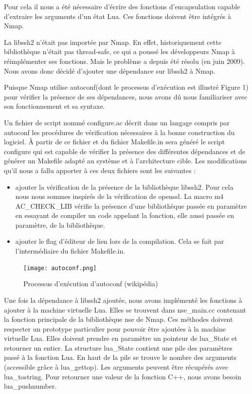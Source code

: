 \documentclass[frenchb]{article}
\begin{document}
Pour cela il nous a \'et\'e n\'ecessaire d'\'ecrire des fonctions d'encapsulation capable d'extraire les arguments d'un \'etat Lua. Ces fonctions doivent être int\'egr\'es à Nmap.

La \textsf{libssh2} n'\'etait pas import\'ee par Nmap. En effet, historiquement cette biblioth\`eque n'\'etait pas thread-safe, ce qui a pouss\'e les d\'eveloppeurs Nmap à r\'eimpl\'ementer ses fonctions. Mais le probl\`eme a depuis \'et\'e r\'esolu (en juin 2009). Nous avons donc d\'ecid\'e d'ajouter une d\'ependance sur \textsf{libssh2} à Nmap.

Puisque Nmap utilise \textsf{autoconf}(dont le processus d'exécution est illustré Figure 1) pour v\'erifier la pr\'esence de ses d\'ependances, nous avons dû nous familiariser avec son fonctionnement et sa syntaxe.

Un fichier de script nomm\'e \textsf{configure.ac} d\'ecrit dans un langage compris par \textsf{autoconf} les proc\'edures de v\'erification n\'ecessaires à la bonne construction du logiciel. À partir de ce fichier et du fichier \textsf{Makefile.in} sera g\'en\'er\'e le script \textsf{configure} qui est capable de v\'erifier la pr\'esence des diff\'erentes d\'ependances et de g\'en\'erer un \textsf{Makefile} adapt\'e au syst\`eme et à l'architecture cible.
Les modifications qu'il nous a fallu apporter à ces deux fichiers sont les suivantes :
\begin{itemize}
    \item ajouter la v\'erification de la pr\'esence de la biblioth\`eque \textsf{libssh2}. Pour cela nous nous sommes inspir\'es de la v\'erification de openssl. La macro \textsf{m4 AC\_CHECK\_LIB} v\'erifie la pr\'esence d'une biblioth\`eque pass\'ee en param\`etre en essayant de compiler un code appelant la fonction, elle aussi pass\'ee en param\`etre, de la biblioth\`eque.
    \item ajouter le flag d'\'editeur de lien lors de la compilation. Cela se fait par l'interm\'ediaire du fichier \textsf{Makefile.in}.
\end{itemize}

\begin{figure}[H]
  \center
  \texttt{[image: autoconf.png]}
  \caption{Processus d'exécution d'autoconf (wikipédia)}
  \label{autoconf}
\end{figure}

Une fois la d\'ependance à \textsf{libssh2} ajout\'ee, nous avons impl\'ement\'e les fonctions à ajouter à la machine virtuelle Lua. Elles se trouvent dans nse\_main.cc contenant la fonction principale de la biblioth\`eque nse de Nmap.
Ces m\'ethodes doivent respecter un prototype particulier pour pouvoir être ajout\'ees à la machine virtuelle Lua. Elles doivent prendre en param\`etre un pointeur de lua\_State et retourner un entier. La structure \textsf{lua\_State} contient une pile des param\`etres pass\'e à la fonction Lua. En haut de la pile se trouve le nombre des arguments (accessible grâce à \textsf{lua\_gettop}). Les arguments peuvent être r\'ecup\'er\'es avec lua\_tostring. Pour retourner une valeur de la fonction C++, nous avons besoin lua\_pushnumber.
\end{document}
